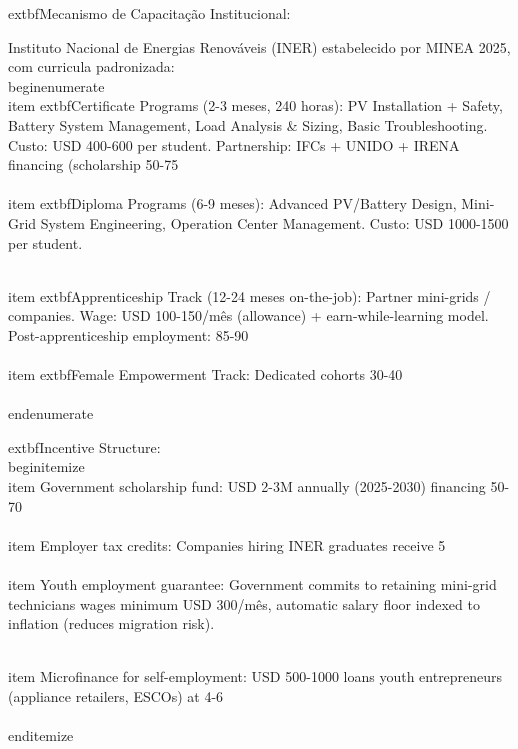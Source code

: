 \documentclass[12pt, a4paper]{article}
\begin{document}
{{{{{{{{{{{{	extbf{Mecanismo de Capacitação Institucional:}

Instituto Nacional de Energias Renováveis (INER) estabelecido por MINEA 2025, com curricula padronizada:
\\begin{enumerate}
\\item 	extbf{Certificate Programs} (2-3 meses, 240 horas): PV Installation + Safety, Battery System Management, Load Analysis & Sizing, Basic Troubleshooting. Custo: USD 400-600 per student. Partnership: IFCs + UNIDO + IRENA financing (scholarship 50-75\\%

\\item 	extbf{Diploma Programs} (6-9 meses): Advanced PV/Battery Design, Mini-Grid System Engineering, Operation Center Management. Custo: USD 1000-1500 per student.

\\item 	extbf{Apprenticeship Track} (12-24 meses on-the-job): Partner mini-grids / companies. Wage: USD 100-150/mês (allowance) + earn-while-learning model. Post-apprenticeship employment: 85-90\\%

\\item 	extbf{Female Empowerment Track}: Dedicated cohorts 30-40\\%
\\end{enumerate}

	extbf{Incentive Structure:}
\\begin{itemize}
\\item Government scholarship fund: USD 2-3M annually (2025-2030) financing 50-70\\%

\\item Employer tax credits: Companies hiring INER graduates receive 5\\%

\\item Youth employment guarantee: Government commits to retaining mini-grid technicians wages minimum USD 300/mês, automatic salary floor indexed to inflation (reduces migration risk).

\\item Microfinance for self-employment: USD 500-1000 loans youth entrepreneurs (appliance retailers, ESCOs) at 4-6\\%
\\end{itemize}

}}}}}}}}}}}}
\end{document}
